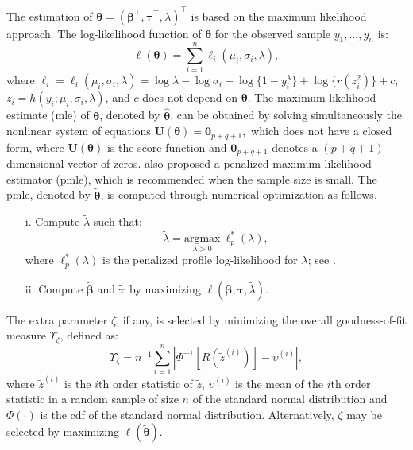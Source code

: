 The estimation of $\bm{\theta}=(\bm{\beta}^{\top},\bm{\tau}^{\top}, \lambda)^{\top}$ is based on the maximum likelihood approach. The log-likelihood function of $\bm{\theta}$ for the observed sample $y_1,\ldots,y_n$ is:
%
\begin{equation*}
\ell (\bm{\theta}) = \sum_{i=1}^{n} \ell_i(\mu_i, \sigma_i, \lambda), \label{logver}
\end{equation*}
%
where $\ell_i= \ell_i(\mu_i, \sigma_i, \lambda) = \log \lambda - \log \sigma_i - \log\{1-y_i^\lambda \} + \log\{ r(z_i^2)\} + c$, $z_i = h(y_i; \mu_i, \sigma_i, \lambda)$, and $c$ does not depend on $\bm{\theta}$. The maximum likelihood estimate (mle) of $\bm{\theta}$, denoted by $\widehat{\bm{\theta}}$, can be obtained by solving simultaneously the nonlinear system of equations $\textbf{U}(\bm{\theta}) = \bm{0}_{p+q+1},$ which does not have a closed form, where $\textbf{U}(\bm{\theta})$ is the score function and $\bm{0}_{p+q+1}$ denotes a $(p+q+1)$-dimensional vector of zeros. \cite{QueirozFerrari2023} also proposed a penalized maximum likelihood estimator (pmle), which is recommended when the sample size is small. The pmle, denoted by $\widetilde{\bm{\theta}}$, is computed through numerical optimization as follows.
\begin{itemize}
\item[i.] Compute $\widetilde{\lambda}$ such that:
\[
\widetilde{\lambda} = \underset{\lambda>0}{\mathrm{argmax}}~\ell_p^*(\lambda),
\]
where $\ell_p^* (\lambda)$ is the penalized profile log-likelihood for $\lambda$; see \citet[Equation 7]{QueirozFerrari2023}.
\item[ii.] Compute $\widetilde{\bm{\beta}}$ and $\widetilde{\bm{\tau}}$ by maximizing $\ell(\bm{\beta}, \bm{\tau}, \widetilde{\lambda})$.
\end{itemize}

The extra parameter $\zeta$, if any, is selected by minimizing the overall goodness-of-fit measure $\Upsilon_\zeta$, defined as:
\begin{equation*}
\Upsilon_\zeta = n^{-1} \displaystyle \sum_{i=1}^n | \Phi^{-1}[R(\widetilde{z}^{(i)})] - \upsilon^{(i)}|,
\end{equation*}
where $\widetilde{z}^{(i)}$ is the $i$th order statistic of $\widetilde{z}$, $\upsilon^{(i)}$ is the mean of the $i$th order statistic in a random sample of size $n$ of the standard normal distribution and $\Phi(\cdot)$ is the cdf of the standard normal distribution. Alternatively, $\zeta$ may be selected by maximizing $\ell(\tilde{\bm{\theta}})$.

